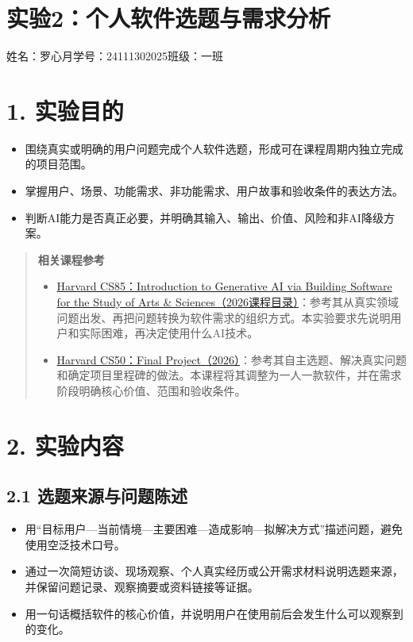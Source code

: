 \documentclass[UTF8,12pt,a4paper]{ctexart}
\begin{document}
\section*{实验2：个人软件选题与需求分析}

\begin{center}
姓名：罗心月\qquad 学号：24111302025\qquad 班级：一班
\end{center}

\section*{1. 实验目的}

\begin{itemize}
  \item 围绕真实或明确的用户问题完成个人软件选题，形成可在课程周期内独立完成的项目范围。
  \item 掌握用户、场景、功能需求、非功能需求、用户故事和验收条件的表达方法。
  \item 判断AI能力是否真正必要，并明确其输入、输出、价值、风险和非AI降级方案。
\end{itemize}

\begin{quote}
\textbf{相关课程参考}

\begin{itemize}
  \item \href{https://seas.harvard.edu/computer-science/courses}{Harvard CS85：Introduction to Generative AI via Building Software for the Study of Arts \& Sciences（2026课程目录）}：参考其从真实领域问题出发、再把问题转换为软件需求的组织方式。本实验要求先说明用户和实际困难，再决定使用什么AI技术。
  \item \href{https://cs50.harvard.edu/x/2026/project/}{Harvard CS50：Final Project（2026）}：参考其自主选题、解决真实问题和确定项目里程碑的做法。本课程将其调整为一人一款软件，并在需求阶段明确核心价值、范围和验收条件。
\end{itemize}
\end{quote}

\section*{2. 实验内容}

\subsection*{2.1 选题来源与问题陈述}

\begin{itemize}
  \item 用“目标用户—当前情境—主要困难—造成影响—拟解决方式”描述问题，避免使用空泛技术口号。
  \item 通过一次简短访谈、现场观察、个人真实经历或公开需求材料说明选题来源，并保留问题记录、观察摘要或资料链接等证据。
  \item 用一句话概括软件的核心价值，并说明用户在使用前后会发生什么可以观察到的变化。
\end{itemize}
\end{document}
